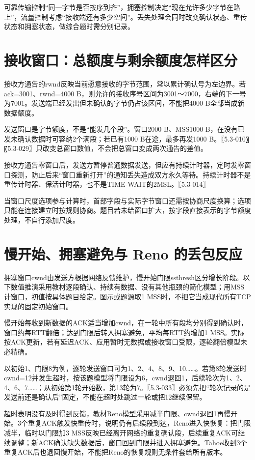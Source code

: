 可靠传输控制``同一字节是否按序到齐''，拥塞控制决定``现在允许多少字节在路上''，流量控制考虑``接收端还有多少空间''。丢失处理会同时改变确认状态、重传状态和拥塞状态，做综合题时需分别记录。

\section{接收窗口：总额度与剩余额度怎样区分}\label{cn-05-07}

接收方通告的rwnd反映当前愿意接收的字节范围，常以累计确认号为左边界。若ack=3001、rwnd=4000 B，则允许的接收序号区间为3001～7000，右端的下一号为7001。发送端已经发出但未确认的字节仍占该区间，不能把4000 B全部当成新数据额度。

发送窗口是字节额度，不是``能发几个段''。窗口2000 B、MSS1000 B，在没有已发未确认数据时可容纳2个满段；若已有1000 B在途，最多再发1000 B。〖5.3-010〗〖5.3-029〗只改变总窗口数值，不会把总窗口变成两次通告的差值。

接收方通告零窗口后，发送方暂停普通数据发送，但应有持续计时器，定时发零窗口探测，防止后来``窗口重新打开''的通知丢失造成双方永久等待。持续计时器不是重传计时器、保活计时器，也不是TIME-WAIT的2MSL。〖5.3-014〗

当窗口尺度选项参与计算时，首部字段与实际字节窗口还需按协商尺度换算；选项只能在连接建立时按规则协商。题目若未给窗口扩大，按字段直接表示的字节额度处理，不自行添加尺度。

\section{慢开始、拥塞避免与 Reno 的丢包反应}\label{cn-05-08}

拥塞窗口cwnd由发送方根据网络反馈维护，慢开始门限ssthresh区分增长阶段。以下数值推演采用教材逐段确认、持续有数据、没有其他瓶颈的简化模型；用MSS计窗口，初值按具体题目给定。图示或题源取1 MSS时，不把它当成现代所有TCP实现的固定初始窗口。

慢开始每收到新数据的ACK适当增加cwnd，在一轮中所有段均分别得到确认时，窗口约每RTT翻倍；达到门限后转入拥塞避免，平均每RTT约增加1 MSS。实际按ACK更新，若有延迟ACK、应用暂时无数据或接收窗口受限，逐轮翻倍模型未必精确。

以初始1、门限8为例，逐轮发送窗口可为1、2、4、8、9、10\ldots\ldots。若第8轮发送时cwnd=12并发生超时，按该题模型将门限设为6，cwnd退回1，后续轮次为1、2、4、6、7\ldots\ldots；从初始第1轮开始数，第13轮为7。〖5.3-033〗必须先把``轮次记录的是发送前还是确认后''固定，不能在超时处跳过一轮或把12继续保留。

超时表明没有及时得到反馈，教材Reno模型采用减半门限、cwnd退回1再慢开始。3个重复ACK触发快重传时，说明仍有后续段到达，Reno进入快恢复：把门限减半，临时以门限加3 MSS反映已经离开网络的重复确认段，后续重复ACK可继续调整；新ACK确认缺失数据后，窗口回到门限并进入拥塞避免。Tahoe收到3个重复ACK后也退回慢开始，不能把Reno的恢复规则无条件套给所有版本。


